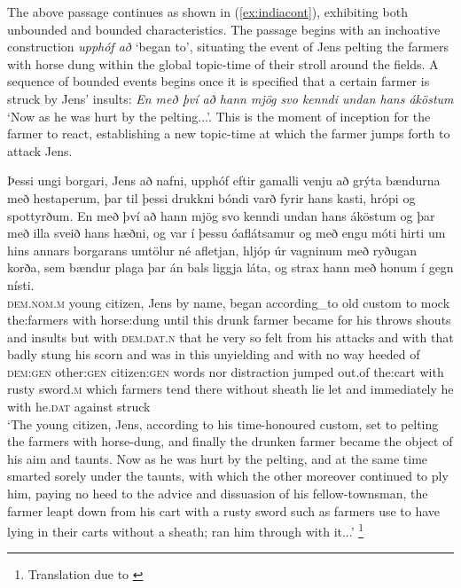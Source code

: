 \documentclass[output=paper,colorlinks,citecolor=brown]{langscibook}
\begin{document}
The above passage continues as shown in (\ref{ex:indiacont}), exhibiting both unbounded and bounded characteristics. The passage begins with an inchoative construction \textit{upphóf að} `began to', situating the event of Jens pelting the farmers with horse dung within the global topic-time of their stroll around the fields. A sequence of bounded events begins once it is specified that a certain farmer is struck by Jens' insults: \textit{En með því að hann mjög svo kenndi undan hans áköstum} `Now as he was hurt by the pelting...'. This is the moment of inception for the farmer to react, establishing a new topic-time at which the farmer jumps forth to attack Jens.

\ea\label{ex:indiacont} 
\gll Þessi ungi borgari, Jens að nafni, upphóf eftir gamalli venju að grýta bændurna með hestaperum, þar til þessi drukkni bóndi varð fyrir hans kasti, hrópi og spottyrðum. En með því að hann mjög svo kenndi undan hans áköstum og þar með illa sveið hans hæðni, og var í þessu óaflátsamur og með engu móti hirti um hins annars borgarans umtölur né afletjan, hljóp úr vagninum með ryðugan korða, sem bændur plaga þar án bals liggja láta, og strax hann með honum í gegn nísti.\\
\textsc{dem}.\textsc{nom.m} young citizen, Jens by name, began according\_to old custom to mock the:farmers with horse:dung until {} this drunk farmer became for his throws shouts and insults but with \textsc{dem}.\textsc{dat.n} that he very so felt from his attacks and with that badly stung his scorn and was in this unyielding and with no way heeded of \textsc{dem}:\textsc{gen} other:\textsc{gen} citizen:\textsc{gen} words nor distraction jumped out.of the:cart with rusty sword.\textsc{m} which farmers tend there without sheath lie let and immediately he with he.\textsc{dat} {} against struck\\
\glt `The young citizen, Jens, according to his time-honoured custom, set to pelting the farmers with horse-dung, and finally the drunken farmer became the object of his aim and taunts. Now as he was hurt by the pelting, and at the same time smarted sorely under the taunts, with which the other moreover continued to ply him, paying no heed to the advice and dissuasion of his fellow-townsman, the farmer leapt down from his cart with a rusty sword such as farmers use to have lying in their carts without a sheath; ran him through with it...' \hfill \citep[39]{olafsson1908aefisaga}\footnote{Translation due to \citet[95--96]{phillpotts2017life}}
\z
\end{document}
